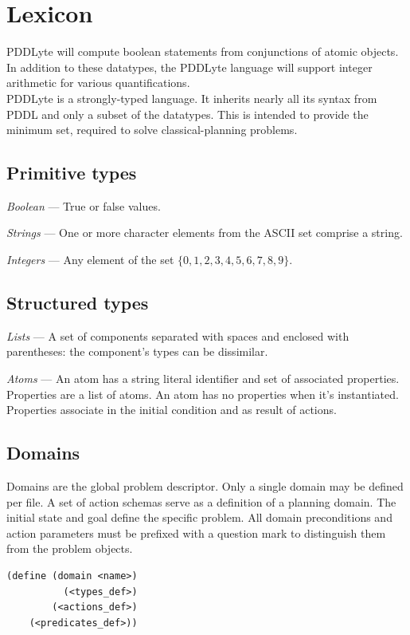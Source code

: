 \documentclass[
a4paper, %
11pt, %
onecolumn, %
openany, %
]{memoir}
\begin{document}
\section{Lexicon}
PDDLyte will compute boolean statements from conjunctions of atomic objects. In addition to these  datatypes, the PDDLyte language will support integer arithmetic for various quantifications.\\
PDDLyte is a strongly-typed language. It inherits nearly all its syntax from PDDL and only a subset of the datatypes. This is intended to provide the minimum set, required to solve classical-planning problems.

{\setlength{\parindent}{0cm}
\subsection{Primitive types}

\textit{Boolean} --- True or false values.

\textit{Strings} --- One or more character elements from the ASCII set comprise a string.

\textit{Integers} --- Any element of the set $\{0, 1, 2, 3, 4, 5, 6, 7, 8, 9 \}$. 

\subsection{Structured types}

\textit{Lists} --- A set of components separated with spaces and enclosed with parentheses: the component's types can be dissimilar.

\textit{Atoms} --- An atom has a string literal identifier and set of associated properties. Properties are a list of atoms. An atom has no properties when it's instantiated. Properties associate in the initial condition and as result of actions.

\subsection{Domains} 
Domains are the global problem descriptor. Only a single domain may be defined per file. A set of action schemas serve as a definition of a planning domain. The initial state and goal define the specific problem. \cite{ai_rn} All domain preconditions and action parameters must be prefixed with a question mark to distinguish them from the problem objects.

\begin{lstlisting}
(define (domain <name>)
          (<types_def>)
        (<actions_def>)
    (<predicates_def>))
\end{lstlisting}

}
\end{document}
